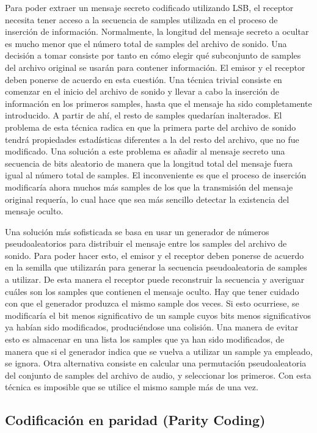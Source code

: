 \documentclass[12pt]{article}
\begin{document}
Para poder extraer un mensaje secreto codificado utilizando LSB, el receptor necesita tener acceso a la secuencia de samples utilizada en el proceso de inserción de información. Normalmente, la longitud del mensaje secreto a ocultar es mucho menor que el número total de samples del archivo de sonido. Una decisión a tomar consiste por tanto en cómo elegir qué subconjunto de samples del archivo original se usarán para contener información. El emisor y el receptor deben ponerse de acuerdo en esta cuestión. Una técnica trivial consiste en comenzar en el inicio del archivo de sonido y llevar a cabo la inserción de información en los primeros samples, hasta que el mensaje ha sido completamente introducido. A partir de ahí, el resto de samples quedarían inalterados. El problema de esta técnica radica en que la primera parte del archivo de sonido tendrá propiedades estadísticas diferentes a la del resto del archivo, que no fue modificado. Una solución a este problema es añadir al mensaje secreto una secuencia de bits aleatorio de manera que la longitud total del mensaje fuera igual al número total de samples. El inconveniente es que el proceso de inserción modificaría ahora muchos más samples de los que la transmisión del mensaje original requería, lo cual hace que sea más sencillo detectar la existencia del mensaje oculto.

Una solución más sofisticada se basa en usar un generador de números pseudoaleatorios para distribuir el mensaje entre los samples del archivo de sonido. Para poder hacer esto, el emisor y el receptor deben ponerse de acuerdo en la semilla que utilizarán para generar la secuencia pseudoaleatoria de samples a utilizar. De esta manera el receptor puede reconstruir la secuencia y averiguar cuáles son los samples que contienen el mensaje oculto. Hay que tener cuidado con que el generador produzca el mismo sample dos veces. Si esto ocurriese, se modificaría el bit menos significativo de un sample cuyos bits menos significativos ya habían sido modificados, produciéndose una colisión. Una manera de evitar esto es almacenar en una lista los samples que ya han sido modificados, de manera que si el generador indica que se vuelva a utilizar un sample ya empleado, se ignora. Otra alternativa consiste en calcular una permutación pseudoaleatoria del conjunto de samples del archivo de audio, y seleccionar los primeros. Con esta técnica es imposible que se utilice el mismo sample más de una vez.

\subsection{Codificación en paridad (Parity Coding)}
\end{document}

